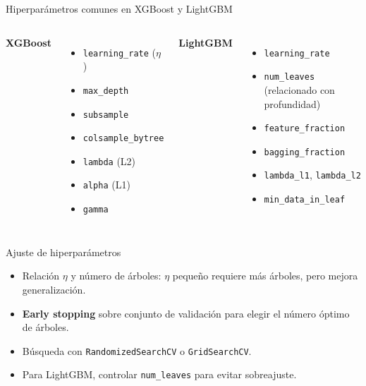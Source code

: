 \documentclass[aspectratio=169, 10pt, xcolor=table]{beamer}
\begin{document}
\begin{frame}{Hiperparámetros comunes en XGBoost y LightGBM}
    \begin{columns}[t]
        \textbf{XGBoost}
        \begin{itemize}
            \item \texttt{learning\_rate} ($\eta$)
            \item \texttt{max\_depth}
            \item \texttt{subsample}
            \item \texttt{colsample\_bytree}
            \item \texttt{lambda} (L2)
            \item \texttt{alpha} (L1)
            \item \texttt{gamma}
        \end{itemize}
        \textbf{LightGBM}
        \begin{itemize}
            \item \texttt{learning\_rate}
            \item \texttt{num\_leaves} (relacionado con profundidad)
            \item \texttt{feature\_fraction}
            \item \texttt{bagging\_fraction}
            \item \texttt{lambda\_l1}, \texttt{lambda\_l2}
            \item \texttt{min\_data\_in\_leaf}
        \end{itemize}
    \end{columns}
\end{frame}

\begin{frame}{Ajuste de hiperparámetros}
    \begin{itemize}
        \item Relación $\eta$ y número de árboles: $\eta$ pequeño requiere más árboles, pero mejora generalización.
        \item \textbf{Early stopping} sobre conjunto de validación para elegir el número óptimo de árboles.
        \item Búsqueda con \texttt{RandomizedSearchCV} o \texttt{GridSearchCV}.
        \item Para LightGBM, controlar \texttt{num\_leaves} para evitar sobreajuste.
    \end{itemize}
\end{frame}
\end{document}
